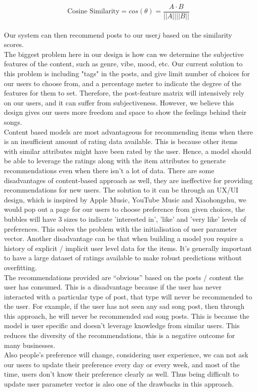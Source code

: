 \begin{equation*}
\text{Cosine Similarity} = cos(\theta) = \frac{A \cdot B}{||A|| ||B||}
\end{equation*}
\\Our system can then recommend posts to our user$j$ based on the similarity scores.
\\The biggest problem here in our design is how can we determine the subjective features of the content, such as genre, vibe, mood, etc. Our current solution to this problem is including "tags" in the posts, and give limit number of choices for our users to choose from, 
and a percentage meter to indicate the degree of the features for them to set. Therefore, the post-feature matrix will intensively rely on our users, and it can suffer from subjectiveness.
However, we believe this design gives our users more freedom and space to show the feelings behind their songs.
\\Content based models are most advantageous for recommending items when there is an insufficient amount of rating data available. This is because other items with similar attributes might have been rated by the user. Hence, a model should be able to leverage the ratings along with the item attributes to generate recommendations even when there isn’t a lot of data.
There are some disadvantages of content-based approach as well, they are ineffective for providing recommendations for new users. 
The solution to it can be through an UX/UI design, which is inspired by Apple Music, YouTube Music and Xiaohongshu, we would pop out a page for our users to choose preference from given choices, the bubbles will have 3 sizes to indicate 'interested in', 'like' and 'very like' levels of preferences. 
This solves the problem with the initialisation of user parameter vector. 
Another disadvantage can be that when building a model you require a history of explicit / implicit user level data for the items. It’s generally important to have a large dataset of ratings available to make robust predictions without overfitting.
\\The recommendations provided are “obvious” based on the posts / content the user has consumed. This is a disadvantage because if the user has never interacted with a particular type of post, that type will never be recommended to the user. 
For example, if the user has not seen any sad song post, then through this approach, he will never be recommended sad song posts. This is because the model is user specific and doesn’t leverage knowledge from similar users. This reduces the diversity of the recommendations, this is a negative outcome for many businesses.
\\Also people's preference will change, considering user experience, we can not ask our users to update their preference every day or every week, 
and most of the time, users don't know their preference clearly as well. Thus being difficult to update user parameter vector is also one of the drawbacks in this approach.

